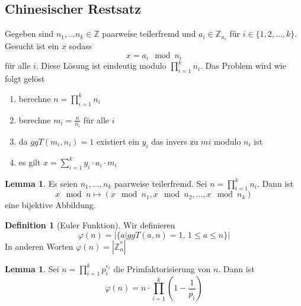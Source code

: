 \documentclass[a4paper, 12pt]{article}
\theoremstyle{plain}
\theoremstyle{definition}
\newtheorem{definition}[theorem]{Definition} %
\theoremstyle{lemma}
\newtheorem{lemma}[theorem]{Lemma}
\theoremstyle{remark}
\theoremstyle{corollary}
\theoremstyle{example}
\begin{document}
	\subsection{Chinesischer Restsatz}
	Gegeben sind $n_1,...n_k \in \mathbb{Z}$ paarweise teilerfremd und $a_i \in \mathbb{Z}_{n_i}$ für $i \in \{1,2,...,k\}$. Gesucht ist ein $x$ sodass \[x = a_i \mod n_i\] für alle $i$. Diese Lösung ist eindeutig modulo $\prod_{i=1}^{k} n_i$. Das Problem wird wie folgt gelöst \begin{enumerate}
		\item berechne $n = \prod_{i=1}^k n_i$
		\item berechne $m_i = \frac{n}{n_i}$ für alle $i$
		\item da $ggT(m_i,n_i) = 1$ existiert ein $y_i$ das invers zu $mi$ modulo $n_i$ ist
		\item es gilt $x = \sum_{i=1}^k y_i\cdot a_i \cdot m_i$
	\end{enumerate}
	\begin{lemma}
		Es seien $n_1,...,n_k$ paarweise teilerfremd. Sei $n = \prod_{i=1}^k n_i$. Dann ist \[x \mod n \mapsto (x \mod n_1, x \mod n_2, ..., x\mod n_k)\] eine bijektive Abbildung.
	\end{lemma}
	\begin{definition}[Euler Funktion]
		Wir definieren \[\varphi(n) = \left|\{a | ggT(a,n) = 1, \, 1 \leq a \leq n\}\right|\] In anderen Worten $\varphi(n) = \left|\mathbb{Z}_n^*\right|$
	\end{definition}
	\begin{lemma}
		Sei $n = \prod_{i=1}^k p_i^{e_i}$ die Primfaktorisierung von $n$. Dann ist \[\varphi(n) = n \cdot \prod_{i=1}^k \left(1-\frac{1}{p_i}\right)\]
	\end{lemma}
\end{document}
